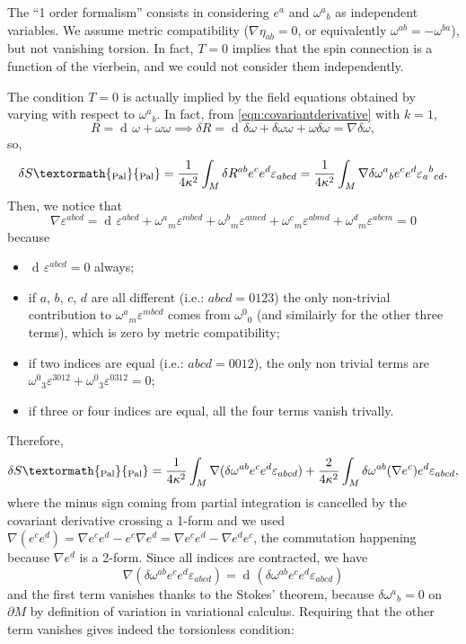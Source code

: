 \documentclass[a4paper,12pt]{book}
\newcommand{\ped}[1]{\textormath{\textsubscript{#1}}{_{\mathrm{#1}}}}
\newcommand{\ap}[1]{\textormath{\textsuperscript{#1}}{^{\mathrm{#1}}}}
\newcommand{\dd}{\mathop{\mathrm{d}\!}{}}
\theoremstyle{definition}
\theoremstyle{remark}
\begin{document}
The ``1\ap{st} order formalism'' consists in considering $e^a$ and $\omega^a{}_b$ as independent variables. We assume metric compatibility ($\nabla\eta_{ab}=0$, or equivalently $\omega^{ab}=-\omega^{ba}$), but not vanishing torsion. In fact, $T=0$ implies that the spin connection is a function of the vierbein, and we could not consider them independently.

The condition $T=0$ is actually implied by the field equations obtained by varying with respect to $\omega^a{}_b$. In fact, from \cref{eqn:covariantderivative} with $k=1$,
\[R=\dd\omega+\omega\omega\implies\delta R=\dd\delta\omega+\delta\omega\omega+\omega\delta\omega=\nabla\delta\omega,\]
so,
\[
\delta S\ped{Pal}=\frac{1}{4\kappa^2}\int_M\delta R^{ab}e^ce^d\varepsilon_{abcd}=\frac{1}{4\kappa^2}\int_M\nabla\delta\omega^a{}_be^ce^d\varepsilon_a{}^b{}_{cd}.
\]
Then, we notice that
\[\nabla\varepsilon^{abcd}=\dd\varepsilon^{abcd}+\omega^a{}_m\varepsilon^{mbcd}+\omega^b{}_m\varepsilon^{amcd}+\omega^c{}_m\varepsilon^{abmd}+\omega^d{}_m\varepsilon^{abcm}=0\]
because
\begin{itemize}
\item $\dd\varepsilon^{abcd}=0$ always;
\item if $a$, $b$, $c$, $d$ are all different (i.e.: $abcd=0123$) the only non-trivial contribution to $\omega^a{}_m\varepsilon^{mbcd}$ comes from $\omega^0{}_0$ (and similairly for the other three terms), which is zero by metric compatibility;
\item if two indices are equal (i.e.: $abcd=0012$), the only non trivial terms are $\omega^0{}_3\varepsilon^{3012}+\omega^0{}_3\varepsilon^{0312}=0$;
\item if three or four indices are equal, all the four terms vanish trivally.
\end{itemize}
Therefore,
\[\delta S\ped{Pal}=\frac{1}{4\kappa^2}\int_M\nabla(\delta\omega^{ab}e^ce^d\varepsilon_{abcd})+\frac{2}{4\kappa^2}\int_M\delta\omega^{ab}(\nabla e^c)e^d\varepsilon_{abcd},\]
where the minus sign coming from partial integration is cancelled by the covariant derivative crossing a 1-form and we used $\nabla(e^ce^d)=\nabla e^ce^d-e^c\nabla e^d=\nabla e^ce^d-\nabla e^de^c$, the commutation happening because $\nabla e^d$ is a 2-form. Since all indices are contracted, we have
\[\nabla(\delta\omega^{ab}e^ce^d\varepsilon_{abcd})=\dd(\delta\omega^{ab}e^ce^d\varepsilon_{abcd})\]
and the first term vanishes thanks to the Stokes' theorem, because $\delta\omega^a{}_b=0$ on $\partial M$ by definition of variation in variational calculus. Requiring that the other term vanishes gives indeed the torsionless condition:
\end{document}
